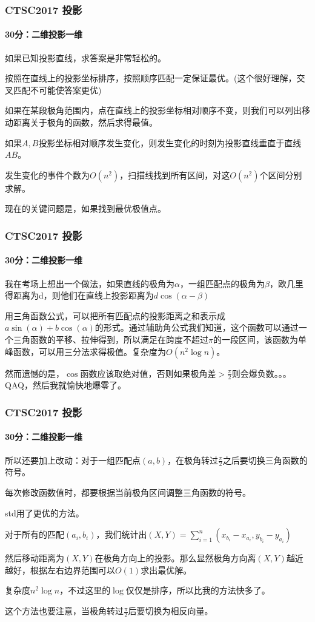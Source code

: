 \begin{frame}
\frametitle{CTSC2017 投影}
\framesubtitle{30分：二维投影一维}
\pause
如果已知投影直线，求答案是非常轻松的。

按照在直线上的投影坐标排序，按照顺序匹配一定保证最优。(这个很好理解，交叉匹配不可能使答案更优)

\pause
如果在某段极角范围内，点在直线上的投影坐标相对顺序不变，则我们可以列出移动距离关于极角的函数，然后求得最值。

如果$A,B$投影坐标相对顺序发生变化，则发生变化的时刻为投影直线垂直于直线$AB$。

发生变化的事件个数为$O(n^2)$，扫描线找到所有区间，对这$O(n^2)$个区间分别求解。

\pause
现在的关键问题是，如果找到最优极值点。
\end{frame}

\begin{frame}
\frametitle{CTSC2017 投影}
\framesubtitle{30分：二维投影一维}
\pause
我在考场上想出一个做法，如果直线的极角为$\alpha$，一组匹配点的极角为$\beta$，欧几里得距离为d，则他们在直线上投影距离为$d \cos(\alpha-\beta)$

用三角函数公式，可以把所有匹配点的投影距离之和表示成$a\sin(\alpha)+b\cos(\alpha)$的形式。通过辅助角公式我们知道，这个函数可以通过一个三角函数的平移、拉伸得到，所以满足在跨度不超过$\pi$的一段区间，该函数为单峰函数，可以用三分法求得极值。\pause 复杂度为$O(n^2 \log n)$。\newline \newline

\pause
然而遗憾的是，$\cos$函数应该取绝对值，否则如果极角差$> \frac{\pi}{2}$则会爆负数。。。QAQ，然后我就愉快地爆零了。
\end{frame}

\begin{frame}
\frametitle{CTSC2017 投影}
\framesubtitle{30分：二维投影一维}
\pause
所以还要加上改动：对于一组匹配点$(a,b)$，在极角转过$\frac{\pi}{2}$之后要切换三角函数的符号。

每次修改函数值时，都要根据当前极角区间调整三角函数的符号。

\pause
std用了更优的方法。

对于所有的匹配$(a_i,b_i)$，我们统计出$(X,Y)=\sum_{i=1}^{n} (x_{b_i}-x_{a_i},y_{b_i}-y_{a_i})$

然后移动距离为$(X,Y)$在极角方向上的投影。那么显然极角方向离$(X,Y)$越近越好，根据左右边界范围可以$O(1)$求出最优解。

复杂度$n^2\log n$，不过这里的$\log$仅仅是排序，所以比我的方法快多了。

\pause
这个方法也要注意，当极角转过$\frac{\pi}{2}$后要切换为相反向量。
\end{frame}

